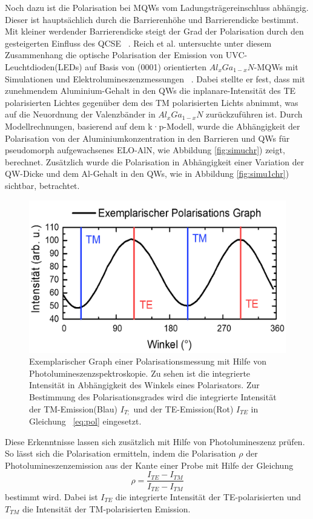 Noch dazu ist die Polarisation bei MQWs vom Ladungsträgereinschluss abhängig. Dieser ist hauptsächlich durch die Barrierenhöhe und Barrierendicke bestimmt. Mit kleiner werdender Barrierendicke steigt der Grad der Polarisation durch den gesteigerten Einfluss des QCSE ~\cite{PhysRevB.84.035305}. 
Reich et al. untersuchte unter diesem Zusammenhang die optische Polarisation der Emission von UVC-Leuchtdioden(LEDs) auf Basis von (0001) orientierten $Al_{x}Ga_{1-x}N$-MQWs mit Simulationen und Elektrolumineszenzmessungen ~\cite{doi:10.1063/1.4932651}. Dabei stellte er fest, dass mit zunehmendem Aluminium-Gehalt in den QWs die inplanare-Intensität des TE polarisierten Lichtes gegenüber dem des TM polarisierten Lichts abnimmt, was auf die Neuordnung der Valenzbänder in $Al_{x}Ga_{1-x}N$ zurückzuführen ist. 
Durch Modellrechnungen, basierend auf dem k·p-Modell, wurde die Abhängigkeit der Polarisation von der Aluminiumkonzentration in den Barrieren und QWs für pseudomorph aufgewachsenes ELO-AlN, wie Abbildung \ref{fig:simuchr}) zeigt, berechnet. Zusätzlich wurde die Polarisation in Abhängigkeit einer Variation der QW-Dicke und dem Al-Gehalt in den QWs, wie in Abbildung \ref{fig:simu1chr}) sichtbar, betrachtet.
\begin{figure}[htb]
  \centering
  \begin{minipage}{\linewidth}
      \centering
      \includegraphics[width=0.6\linewidth]{Bilder/exemplPolGraph.png}
      \caption{Exemplarischer Graph einer Polarisationsmessung mit Hilfe von Photolumineszenzspektroskopie. Zu sehen ist die integrierte Intensität in Abhängigkeit des Winkels eines Polarisators. Zur Bestimmung des Polarisationsgrades wird die integrierte Intensität der TM-Emission(Blau) $I_{T;}$  und der TE-Emission(Rot) $I_{TE}$ in Gleichung ~\ref{eq:pol} eingesetzt.}
      \label{fig:degra}
  \end{minipage}
\end{figure}
Diese Erkenntnisse lassen sich zusätzlich mit Hilfe von Photolumineszenz prüfen. So lässt sich die Polarisation ermitteln, indem die Polarisation $\rho$ der Photolumineszenzemission aus der Kante einer Probe mit Hilfe der Gleichung 
\begin{equation}
\rho = \frac{ I_{TE} - I_{TM} }{ I_{TE} - I_{TM} } 
\label{eq:pol}
\end{equation}
bestimmt wird. Dabei ist $I_{TE}$ die integrierte Intensität der TE-polarisierten und $T_{TM}$ die Intensität der TM-polarisierten Emission. 
 


